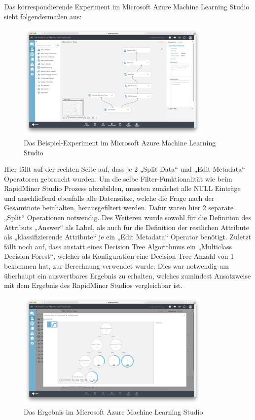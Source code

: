 Das korrespondierende Experiment im Microsoft Azure Machine Learning Studio
sieht folgendermaßen aus:

\begin{figure}[htb]
  \center
	\includegraphics[width=0.85\textwidth]{gfx/msaproc.png}
	\caption{Das Beispiel-Experiment im Microsoft Azure Machine Learning Studio}
	\label{fig:example:impl:msa:proc}
\end{figure}

Hier fällt auf der rechten Seite auf, dass je 2 „Split Data“ und „Edit Metadata“
Operatoren gebraucht wurden. Um die selbe Filter-Funktionalität wie beim
RapidMiner Studio Prozess abzubilden, mussten zunächst alle NULL Einträge und
anschließend ebenfalls alle Datensätze, welche die Frage nach der Gesamtnote
beinhalten, herausgefiltert werden. Dafür waren hier 2 separate „Split“
Operationen notwendig. Des Weiteren wurde sowohl für die Definition des
Attributs „Answer“ als Label, als auch für die Definition der restlichen
Attribute als „klassifizierende Attribute“ je ein „Edit Metadata“ Operator
benötigt. Zuletzt fällt noch auf, dass anstatt eines Decision Tree Algorithmus
ein „Multiclass Decision Forest“, welcher als Konfiguration eine Decision-Tree
Anzahl von 1 bekommen hat, zur Berechnung verwendet wurde. Dies war notwendig
um überhaupt ein auswertbares Ergebnis zu erhalten, welches zumindest
Ansatzweise mit dem Ergebnis des RapidMiner Studios vergleichbar ist.

\begin{figure}[htb]
  \center
	\includegraphics[width=0.85\textwidth]{gfx/msares.png}
	\caption{Das Ergebnis im Microsoft Azure Machine Learning Studio}
	\label{fig:example:impl:msa:res}
\end{figure}

